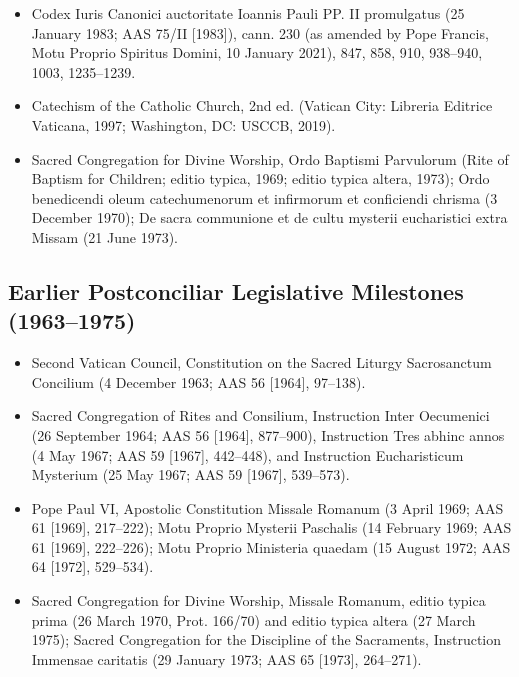 \begin{itemize}
\item Codex Iuris Canonici auctoritate Ioannis Pauli PP. II promulgatus (25 January 1983; AAS 75/II [1983]), cann. 230 (as amended by Pope Francis, Motu Proprio Spiritus Domini, 10 January 2021), 847, 858, 910, 938--940, 1003, 1235--1239.
\item Catechism of the Catholic Church, 2nd ed. (Vatican City: Libreria Editrice Vaticana, 1997; Washington, DC: USCCB, 2019).
\item Sacred Congregation for Divine Worship, Ordo Baptismi Parvulorum (Rite of Baptism for Children; editio typica, 1969; editio typica altera, 1973); Ordo benedicendi oleum catechumenorum et infirmorum et conficiendi chrisma (3 December 1970); De sacra communione et de cultu mysterii eucharistici extra Missam (21 June 1973).
\end{itemize}
\subsection*{Earlier Postconciliar Legislative Milestones (1963--1975)}
\begin{itemize}
\item Second Vatican Council, Constitution on the Sacred Liturgy Sacrosanctum Concilium (4 December 1963; AAS 56 [1964], 97--138).
\item Sacred Congregation of Rites and Consilium, Instruction Inter Oecumenici (26 September 1964; AAS 56 [1964], 877--900), Instruction Tres abhinc annos (4 May 1967; AAS 59 [1967], 442--448), and Instruction Eucharisticum Mysterium (25 May 1967; AAS 59 [1967], 539--573).
\item Pope Paul VI, Apostolic Constitution Missale Romanum (3 April 1969; AAS 61 [1969], 217--222); Motu Proprio Mysterii Paschalis (14 February 1969; AAS 61 [1969], 222--226); Motu Proprio Ministeria quaedam (15 August 1972; AAS 64 [1972], 529--534).
\item Sacred Congregation for Divine Worship, Missale Romanum, editio typica prima (26 March 1970, Prot. 166/70) and editio typica altera (27 March 1975); Sacred Congregation for the Discipline of the Sacraments, Instruction Immensae caritatis (29 January 1973; AAS 65 [1973], 264--271).
\end{itemize}
